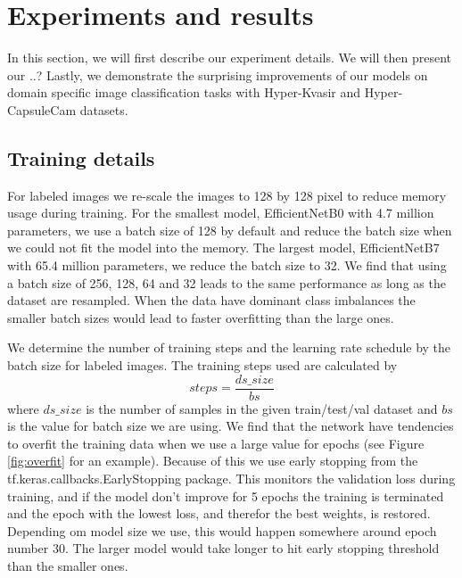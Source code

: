 \documentclass[thesis.tex]{subfiles}
\begin{document}
\chapter{Experiments and results} \label{chap:experiments}
In this section, we will first describe our experiment details. We will then present our ..?
Lastly, we demonstrate the surprising improvements of our models on domain specific image classification tasks with Hyper-Kvasir and Hyper-CapsuleCam datasets.



\section{Training details}

For labeled images we re-scale the images to 128 by 128 pixel to reduce memory usage during training. For the smallest model, EfficientNetB0 with 4.7 million parameters, we use a batch size of 128 by default and reduce the batch size when we could not fit the model into the memory. The largest model, EfficientNetB7 with 65.4 million parameters, we reduce the batch size to 32. We find that using a batch size of 256, 128, 64 and 32 leads to the same performance as long as the dataset are resampled. When the data have dominant class imbalances the smaller batch sizes would lead to faster overfitting than the large ones.

We determine the number of training steps and the learning rate schedule by the batch size for labeled images. The training steps used are calculated by $$ steps = \frac{ds\_size}{bs} $$ where $ds\_size$ is the number of samples in the given train/test/val dataset and $bs$ is the value for batch size we are using. We find that the network have tendencies to overfit the training data when we use a large value for epochs (see Figure \ref{fig:overfit} for an example). Because of this we use early stopping from the tf.keras.callbacks.EarlyStopping package. This  monitors the validation loss during training, and if the model don't improve for 5 epochs the training is terminated and the epoch with the lowest loss, and therefor the best weights, is restored. Depending om model size we use, this would happen somewhere around epoch number 30. The larger model would take longer to hit early stopping threshold than the smaller ones.
\end{document}
